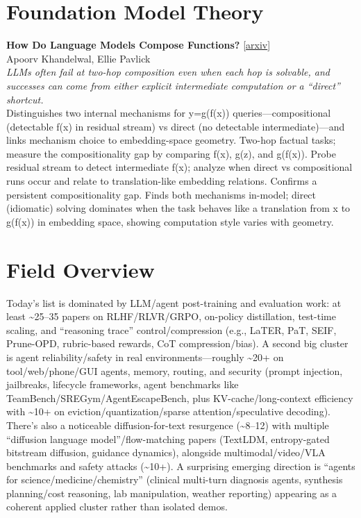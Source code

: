 \documentclass[12pt,letterpaper]{article}
\begin{document}
\medskip


\section*{Foundation Model Theory}

{\small\textbf{How Do Language Models Compose Functions?}} {\scriptsize[\href{https://arxiv.org/abs/2510.01685}{arxiv}]}\\
{\scriptsize Apoorv Khandelwal, Ellie Pavlick}\\

{\small\textit{LLMs often fail at two-hop composition even when each hop is solvable, and successes can come from either explicit intermediate computation or a ``direct'' shortcut.}}\\[1pt]
{\footnotesize Distinguishes two internal mechanisms for y=g(f(x)) queries---compositional (detectable f(x) in residual stream) vs direct (no detectable intermediate)---and links mechanism choice to embedding-space geometry. Two-hop factual tasks; measure the compositionality gap by comparing f(x), g(z), and g(f(x)). Probe residual stream to detect intermediate f(x); analyze when direct vs compositional runs occur and relate to translation-like embedding relations. Confirms a persistent compositionality gap. Finds both mechanisms in-model; direct (idiomatic) solving dominates when the task behaves like a translation from x to g(f(x)) in embedding space, showing computation style varies with geometry.}

\medskip



\section*{Field Overview}
{\footnotesize Today's list is dominated by LLM/agent post-training and evaluation work: at least \textasciitilde{}25--35 papers on RLHF/RLVR/GRPO, on-policy distillation, test-time scaling, and ``reasoning trace'' control/compression (e.g., LaTER, PaT, SEIF, Prune-OPD, rubric-based rewards, CoT compression/bias). A second big cluster is agent reliability/safety in real environments---roughly \textasciitilde{}20+ on tool/web/phone/GUI agents, memory, routing, and security (prompt injection, jailbreaks, lifecycle frameworks, agent benchmarks like TeamBench/SREGym/AgentEscapeBench, plus KV-cache/long-context efficiency with \textasciitilde{}10+ on eviction/quantization/sparse attention/speculative decoding). There's also a noticeable diffusion-for-text resurgence (\textasciitilde{}8--12) with multiple ``diffusion language model''/flow-matching papers (TextLDM, entropy-gated bitstream diffusion, guidance dynamics), alongside multimodal/video/VLA benchmarks and safety attacks (\textasciitilde{}10+). A surprising emerging direction is ``agents for science/medicine/chemistry'' (clinical multi-turn diagnosis agents, synthesis planning/cost reasoning, lab manipulation, weather reporting) appearing as a coherent applied cluster rather than isolated demos.}
\end{document}

